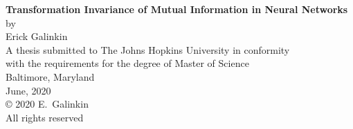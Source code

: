 \thispagestyle{empty}
\baselineskip=18pt
\begin{center}
\vspace*{3\baselineskip}
%
{\bfseries Transformation Invariance of Mutual Information in Neural Networks}\\[6\baselineskip]
%
by\\
%
Erick Galinkin\\[3\baselineskip]
%
%
A thesis submitted to The Johns Hopkins University in conformity\\
with the requirements for the degree of Master of Science\\[4\baselineskip]
%
Baltimore, Maryland\\
June, 2020\\[6\baselineskip]
%
{\copyright{} 2020 E.~Galinkin\\
All rights reserved}
%
\end{center}
%
\baselineskip=24pt
\newpage 
